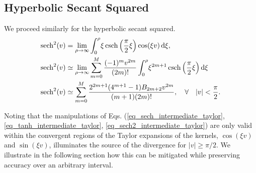 \subsection{Hyperbolic Secant Squared}
We proceed similarly for the hyperbolic secant squared.
\begin{align}
	\operatorname{sech}^2(v) &= \lim_{\rho \to \infty}
	\int_0^\rho \!
	\xi\operatorname{csch}\left(\frac{\pi}{2}\xi\right)\cos(\xi v) \,
	\mathrm{d}\xi, \\
	\operatorname{sech}^2(v) &\simeq
	\lim_{\rho \to \infty}
	\sum_{m=0}^M
	\frac{(-1)^m v^{2 m}}{(2 m)!}
	\int_0^\rho \!
	\xi^{2 m + 1}\operatorname{csch}\left(\frac{\pi}{2}\xi\right)
	\mathrm{d}\xi \label{eq_sech2_intermediate_taylor} \\
	\operatorname{sech}^2(v) &\simeq
	\sum_{m=0}^{M} \frac{2^{2m+1}(4^{m+1}-1)B_{2m+2}v^{2m}}{(m+1)(2m)!},
	\quad \forall \quad |v| < \frac{\pi}{2}.
\end{align}

Noting that the manipulations of Eqs. (\ref{eq_sech_intermediate_taylor}, \ref{eq_tanh_intermediate_taylor}, \ref{eq_sech2_intermediate_taylor})
are only valid within the convergent regions of the Taylor
expansions of the kernels, $\cos(\xi v)$ and $\sin(\xi v)$, illuminates the source of
the divergence for $|v|\geq \pi/2$. We illustrate in the following section
how this can be mitigated while preserving accuracy over
an arbitrary interval.


